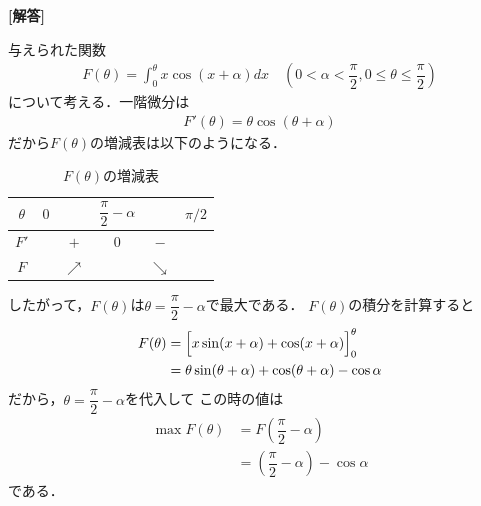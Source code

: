 \documentclass[../../main.tex]{subfiles}
\begin{document}
\begin{oframed}
  
\end{oframed}

{\bf [解答]}

与えられた関数
\begin{align}
  F(\theta)=\int_0^{\theta}x\cos(x+\alpha)dx \quad  (0<\alpha<\dfrac{\pi}{2},0\le \theta \le \dfrac{\pi}{2}) \label{eq:1}
\end{align}
について考える．一階微分は
\begin{align}
  F'(\theta)=\theta\cos(\theta+\alpha)
\end{align}
だから$F(\theta)$の増減表は以下のようになる．

\begin{table}[htb]
  \centering
  \caption{$F(\theta)$の増減表}
  \begin{tabular}{c|ccccc}
    $\theta$ & $0$ & & $\dfrac{\pi}{2}-\alpha$ & & $\pi/2$ \\
    \hline
    $F'$ & & $+$ & $0$ & $-$ & \\
    \hline
    $F$ & & $\nearrow$ & & $\searrow$ & \\
  \end{tabular}
\end{table}

したがって，$F(\theta)$は$\theta=\dfrac{\pi}{2}-\alpha$で最大である．
$F(\theta)$の積分を計算すると
\begin{align}
  F(\theta)
  &=\Bigl[x\sin(x+\alpha)+\cos(x+\alpha)\Bigr]_0^{\theta} \\
  &=\theta\sin(\theta+\alpha)+\cos(\theta+\alpha) - \cos\alpha
\end{align}
だから，$\theta=\dfrac{\pi}{2}-\alpha$を代入して
この時の値は
\begin{align}
  \max F(\theta)
  &= F(\dfrac{\pi}{2}-\alpha) \\
  &=\left(\dfrac{\pi}{2}-\alpha\right)-\cos\alpha
\end{align}
である．

\newpage
\end{document}

